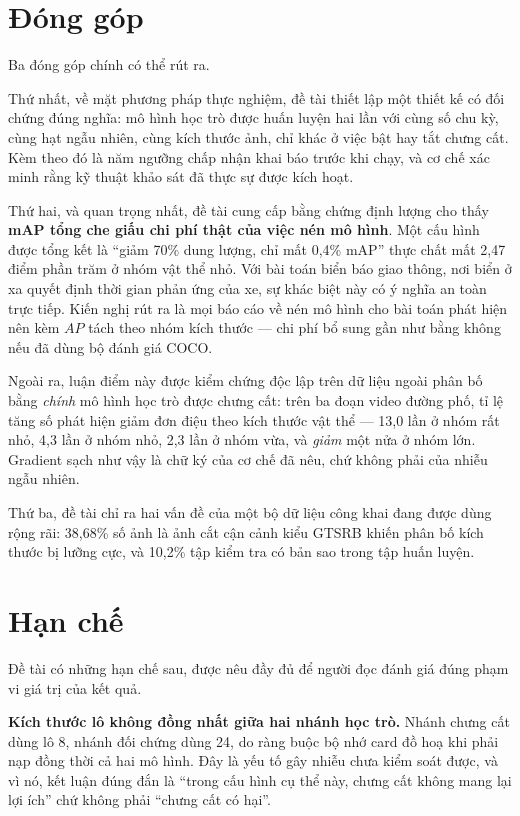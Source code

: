\section{Đóng góp}

Ba đóng góp chính có thể rút ra.

Thứ nhất, về mặt phương pháp thực nghiệm, đề tài thiết lập một thiết kế có đối chứng đúng nghĩa: mô
hình học trò được huấn luyện hai lần với cùng số chu kỳ, cùng hạt ngẫu nhiên, cùng kích thước ảnh,
chỉ khác ở việc bật hay tắt chưng cất. Kèm theo đó là năm ngưỡng chấp nhận khai báo trước khi chạy,
và cơ chế xác minh rằng kỹ thuật khảo sát đã thực sự được kích hoạt.

Thứ hai, và quan trọng nhất, đề tài cung cấp bằng chứng định lượng cho thấy \textbf{mAP tổng che
giấu chi phí thật của việc nén mô hình}. Một cấu hình được tổng kết là ``giảm 70\% dung lượng, chỉ
mất 0,4\% mAP'' thực chất mất 2,47 điểm phần trăm ở nhóm vật thể nhỏ. Với bài toán biển báo giao
thông, nơi biển ở xa quyết định thời gian phản ứng của xe, sự khác biệt này có ý nghĩa an toàn trực
tiếp. Kiến nghị rút ra là mọi báo cáo về nén mô hình cho bài toán phát hiện nên kèm $AP$ tách theo
nhóm kích thước --- chi phí bổ sung gần như bằng không nếu đã dùng bộ đánh giá COCO.

Ngoài ra, luận điểm này được kiểm chứng độc lập trên dữ liệu ngoài phân bố bằng \emph{chính} mô
hình học trò được chưng cất: trên ba đoạn video đường phố, tỉ lệ tăng số phát hiện giảm đơn điệu
theo kích thước vật thể --- 13,0 lần ở nhóm rất nhỏ, 4,3 lần ở nhóm nhỏ, 2,3 lần ở nhóm vừa, và
\emph{giảm} một nửa ở nhóm lớn. Gradient sạch như vậy là chữ ký của cơ chế đã nêu, chứ không phải
của nhiễu ngẫu nhiên.

Thứ ba, đề tài chỉ ra hai vấn đề của một bộ dữ liệu công khai đang được dùng rộng rãi: 38,68\% số
ảnh là ảnh cắt cận cảnh kiểu GTSRB khiến phân bố kích thước bị lưỡng cực, và 10,2\% tập kiểm tra có
bản sao trong tập huấn luyện.

\section{Hạn chế}

Đề tài có những hạn chế sau, được nêu đầy đủ để người đọc đánh giá đúng phạm vi giá trị của kết
quả.

\textbf{Kích thước lô không đồng nhất giữa hai nhánh học trò.} Nhánh chưng cất dùng lô 8, nhánh đối
chứng dùng 24, do ràng buộc bộ nhớ card đồ hoạ khi phải nạp đồng thời cả hai mô hình. Đây là yếu tố
gây nhiễu chưa kiểm soát được, và vì nó, kết luận đúng đắn là ``trong cấu hình cụ thể này, chưng
cất không mang lại lợi ích'' chứ không phải ``chưng cất có hại''.

